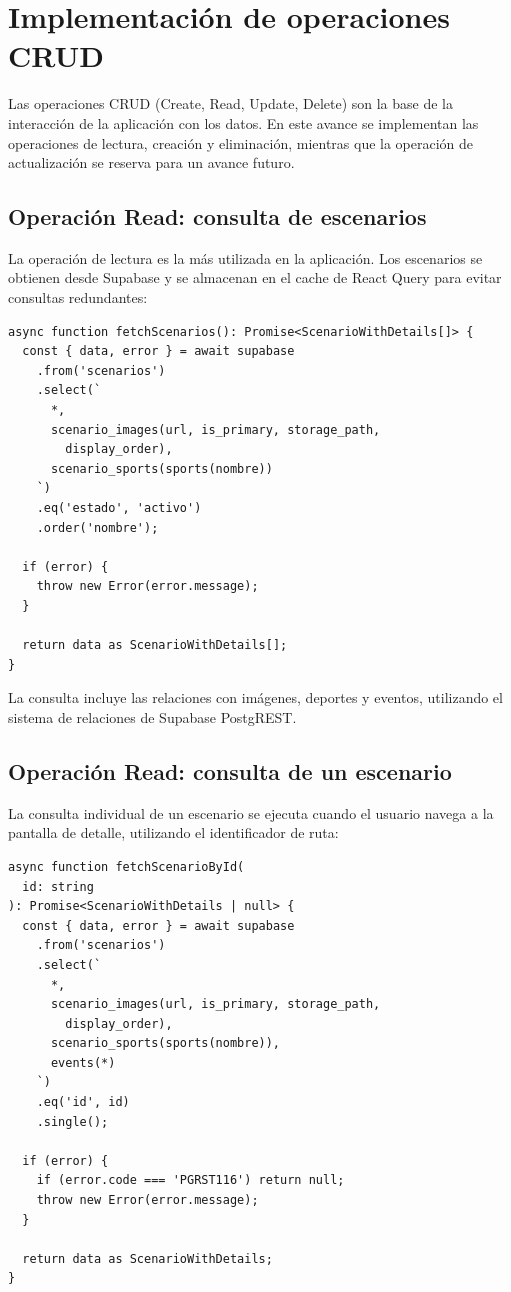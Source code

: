 
\section{Implementaci\'on de operaciones CRUD}

Las operaciones CRUD (Create, Read, Update, Delete) son la base de la
interacci\'on de la aplicaci\'on con los datos. En este avance se implementan
las operaciones de lectura, creaci\'on y eliminaci\'on, mientras que la
operaci\'on de actualizaci\'on se reserva para un avance futuro.

\subsection{Operaci\'on Read: consulta de escenarios}

La operaci\'on de lectura es la m\'as utilizada en la aplicaci\'on. Los
escenarios se obtienen desde Supabase y se almacenan en el cache de
React Query para evitar consultas redundantes:

\begin{lstlisting}
async function fetchScenarios(): Promise<ScenarioWithDetails[]> {
  const { data, error } = await supabase
    .from('scenarios')
    .select(`
      *,
      scenario_images(url, is_primary, storage_path,
        display_order),
      scenario_sports(sports(nombre))
    `)
    .eq('estado', 'activo')
    .order('nombre');

  if (error) {
    throw new Error(error.message);
  }

  return data as ScenarioWithDetails[];
}
\end{lstlisting}

La consulta incluye las relaciones con im\'agenes, deportes y eventos,
utilizando el sistema de relaciones de Supabase PostgREST.

\subsection{Operaci\'on Read: consulta de un escenario}

La consulta individual de un escenario se ejecuta cuando el usuario
navega a la pantalla de detalle, utilizando el identificador de ruta:

\begin{lstlisting}
async function fetchScenarioById(
  id: string
): Promise<ScenarioWithDetails | null> {
  const { data, error } = await supabase
    .from('scenarios')
    .select(`
      *,
      scenario_images(url, is_primary, storage_path,
        display_order),
      scenario_sports(sports(nombre)),
      events(*)
    `)
    .eq('id', id)
    .single();

  if (error) {
    if (error.code === 'PGRST116') return null;
    throw new Error(error.message);
  }

  return data as ScenarioWithDetails;
}
\end{lstlisting}

